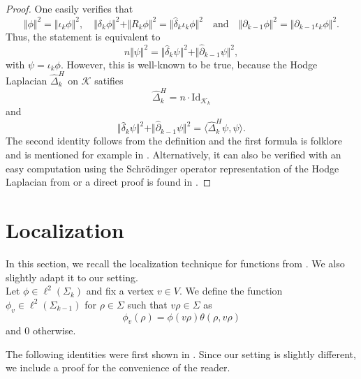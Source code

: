 \documentclass[10pt]{amsart}
\theoremstyle{definition}
\newcommand{\K}{\mathcal{K}}
\begin{document}
\begin{proof}
    One easily verifies that \[\Vert\phi\Vert^2 = \Vert\iota_k\phi\Vert^2,\quad\Vert\delta_k\phi\Vert^2+\Vert R_k\phi\Vert^2 = \Vert\widehat\delta_k\iota_k\phi\Vert^2\quad\text{and}\quad\Vert\partial_{k-1}\phi\Vert^2 = \Vert\widehat\partial_{k-1}\iota_k\phi\Vert^2.\]
    Thus, the statement is equivalent to 
    \[n\Vert\psi\Vert^2 = \Vert\widehat\delta_k\psi\Vert^2+\Vert\widehat\partial_{k-1}\psi\Vert^2,\]
    with $\psi = \iota_k\phi.$
    However, this is well-known to be true, because the Hodge Laplacian $\widehat\Delta_k^H$ on $\K$ satifies \[\widehat\Delta^H_k = n\cdot \mathrm {Id}_{\K_k}\] and 
    \[ \Vert\widehat\delta_k\psi\Vert^2+\Vert\widehat\partial_{k-1}\psi\Vert^2 = \langle\widehat\Delta^H_k\psi,\psi\rangle.\]
    The second  identity follows from the definition and the first formula is  folklore and is mentioned for example in \cite[Lemma~8]{GundertWagner}. Alternatively, it can also be verified with an easy computation using the Schrödinger operator representation of the Hodge Laplacian from \cite[Lemma~3.13]{BK} or a direct proof is found in \cite[Lemma~3.2]{zhang2026upper}.
\end{proof}
\section{Localization}\label{local}
In this section, we recall the localization technique for functions from \cite{AharoniBergerMeshulam}. We also slightly adapt it to our setting.\\


Let $\phi\in\ell^2(\Sigma_k)$ and fix a vertex $v\in V.$ 
We  define the function $\phi_v\in\ell^2(\Sigma_{k-1})$ for $\rho\in\Sigma$ such that $v\rho\in \Sigma$ as
\[\phi_v(\rho) = \phi(v\rho)\theta(\rho,v\rho)\]
and $0$ otherwise.

The following identities were first shown in \cite{AharoniBergerMeshulam}. Since our setting is slightly different, we include a proof for the convenience of the reader.
\end{document}
